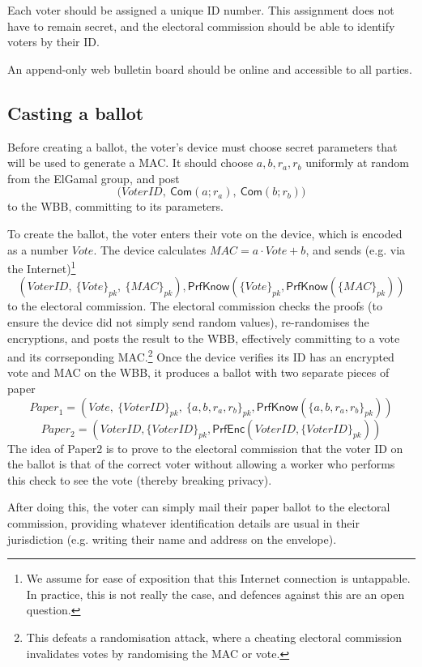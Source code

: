 \documentclass[11pt,twoside,a4paper]{article}
\newcommand{\commit}{\mathsf{Com}}
\newcommand{\PrfEnc}{\mathsf{PrfEnc}}
\newcommand{\PrfKnow}{\mathsf{PrfKnow}}
\theoremstyle{definition}
\newcommand{\Vote}{\mathit{Vote}}
\newcommand{\VoterID}{\mathit{VoterID}}
\newcommand{\Paper}{\mathit{Paper}}
\newcommand{\Mac}{\mathit{MAC}}
\begin{document}
Each voter should be assigned a unique ID number. This assignment does not have to remain secret, and the electoral commission should be able to identify voters by their ID.

An append-only web bulletin board should be online and accessible to all parties.
\subsection{Casting a ballot}
Before creating a ballot, the voter's device must choose secret parameters that will be used to generate a MAC. It should choose $a,b,r_a,r_b$ uniformly at random from the ElGamal group, and post
$$\big(\VoterID,\ \commit(a;r_a),\ \commit(b;r_b)\big)$$
to the WBB, committing to its parameters.

To create the ballot, the voter enters their vote on the device, which is encoded as a number $\Vote$. The device calculates $\Mac=a\cdot \Vote+b$, and sends (e.g. via the Internet)\footnote{We assume for ease of exposition that this Internet connection is untappable. In practice, this is not really the case, and defences against this are an open question.}
$$\left(\VoterID,\ \{\Vote\}_{pk},\ \{\Mac\}_{pk}\right), \PrfKnow(\{\Vote\}_{pk}, \PrfKnow(\{\Mac\}_{pk}))$$
to the electoral commission. The electoral commission checks the proofs (to ensure the device did not simply send random values), re-randomises the encryptions, and posts the result to the WBB, effectively committing to a vote and its corrseponding MAC.\footnote{This defeats a randomisation attack, where a cheating electoral commission invalidates votes by randomising the MAC or vote.} Once the device verifies its ID has an encrypted vote and MAC on the WBB, it produces a ballot with two separate pieces of paper
$$\Paper_1 = \left(\Vote,\ \{\VoterID\}_{pk},\ \{a,b,r_a,r_b\}_{pk}, \PrfKnow(\{a,b,r_a,r_b\}_{pk})\right)$$
$$\Paper_2 = \left(\VoterID, \{\VoterID\}_{pk}, \PrfEnc(\VoterID, \{\VoterID\}_{pk})\right)$$
The idea of Paper2 is to prove to the electoral commission that the voter ID on the ballot is that of the correct voter without allowing a worker who performs this check to see the vote (thereby breaking privacy).

After doing this, the voter can simply mail their paper ballot to the electoral commission, providing whatever identification details are usual in their jurisdiction (e.g. writing their name and address on the envelope).
\end{document}
